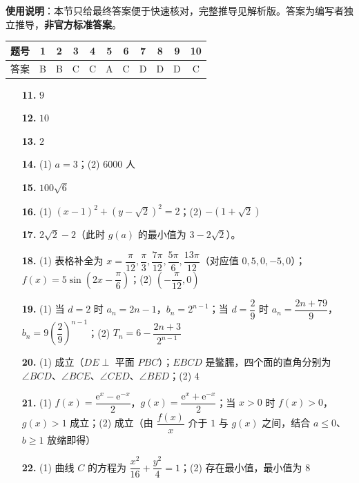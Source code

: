 
\begin{gknotice}
\textbf{使用说明}：本节只给最终答案便于快速核对，完整推导见解析版。答案为编写者独立推导，\textbf{非官方标准答案}。
\end{gknotice}

\begin{center}\begin{tabular}{ccccccccccc}
\toprule
题号 & 1 & 2 & 3 & 4 & 5 & 6 & 7 & 8 & 9 & 10 \\
\midrule
答案 & B & B & C & C & A & C & D & D & D & C \\
\bottomrule
\end{tabular}\end{center}

\begin{itemize}[leftmargin=2.6em]
  \item[\textbf{11.}] \(9\)
  \item[\textbf{12.}] \(10\)
  \item[\textbf{13.}] \(2\)
  \item[\textbf{14.}] (1) \(a=3\)；(2) \(6000\) 人
  \item[\textbf{15.}] \(100\sqrt6\)
  \item[\textbf{16.}] (1) \((x-1)^2+(y-\sqrt2)^2=2\)；(2) \(-(1+\sqrt2)\)
  \item[\textbf{17.}] \(2\sqrt2-2\)（此时 \(g(a)\) 的最小值为 \(3-2\sqrt2\)）。
\end{itemize}

\begin{itemize}[leftmargin=2.6em]
  \item[\textbf{18.}] (1) 表格补全为 \(x=\dfrac{\pi}{12},\dfrac{\pi}{3},\dfrac{7\pi}{12},\dfrac{5\pi}{6},\dfrac{13\pi}{12}\)（对应值 \(0,5,0,-5,0\)）；\(f(x)=5\sin\left(2x-\dfrac{\pi}{6}\right)\)；(2) \(\left(-\dfrac{\pi}{12},0\right)\)
  \item[\textbf{19.}] (1) 当 \(d=2\) 时 \(a_n=2n-1\)，\(b_n=2^{n-1}\)；当 \(d=\dfrac29\) 时 \(a_n=\dfrac{2n+79}{9}\)，\(b_n=9\left(\dfrac29\right)^{n-1}\)；(2) \(T_n=6-\dfrac{2n+3}{2^{n-1}}\)
  \item[\textbf{20.}] (1) 成立（\(DE\perp\) 平面 \(PBC\)）；\(EBCD\) 是鳖臑，四个面的直角分别为 \(\angle BCD\)、\(\angle BCE\)、\(\angle CED\)、\(\angle BED\)；(2) \(4\)
  \item[\textbf{21.}] (1) \(f(x)=\dfrac{\mathrm{e}^x-\mathrm{e}^{-x}}{2}\)，\(g(x)=\dfrac{\mathrm{e}^x+\mathrm{e}^{-x}}{2}\)；当 \(x>0\) 时 \(f(x)>0\)，\(g(x)>1\) 成立；(2) 成立（由 \(\dfrac{f(x)}{x}\) 介于 \(1\) 与 \(g(x)\) 之间，结合 \(a\leqslant0\)、\(b\geqslant1\) 放缩即得）
  \item[\textbf{22.}] (1) 曲线 \(C\) 的方程为 \(\dfrac{x^2}{16}+\dfrac{y^2}{4}=1\)；(2) 存在最小值，最小值为 \(8\)
\end{itemize}
